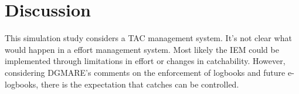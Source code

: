 \documentclass[a4paper]{article}
\begin{document}
\section{Discussion}

This simulation study considers a TAC management system. It's not clear what would happen in a effort management system. Most likely the IEM could be implemented through limitations in effort or changes in catchability. However, considering DGMARE's comments on the enforcement of logbooks and future e-logbooks, there is the expectation that catches can be controlled.
\end{document}

